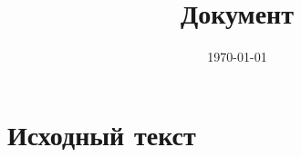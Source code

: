 \documentclass[a4paper,12pt]{article}
\title{Документ}
\author{}
\date{\today}
\begin{document}
\maketitle

\section{Исходный текст}

\end{document}
